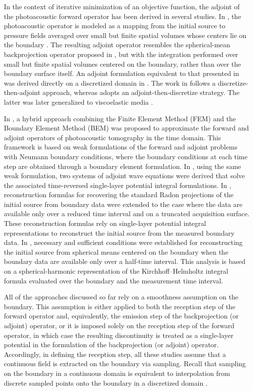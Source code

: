 \documentclass[11pt,reqno]{amsart}
\theoremstyle{remark}
\begin{document}
In the context of iterative minimization of an objective function, the adjoint of the photoacoustic forward operator has been derived in several studies. In \cite{Arridge2016}, the photoacoustic operator is modeled as a mapping from the initial source to pressure fields averaged over small but finite spatial volumes whose centers lie on the boundary \cite{Arridge2016}. The resulting adjoint operator resembles the spherical-mean backprojection operator proposed in \cite{Kruger1995}, but with the integration performed over small but finite spatial volumes centered on the boundary, rather than over the boundary surface itself.  An adjoint formulation equivalent to that presented in \cite{Arridge2016} was derived directly on a discretized domain in \cite{Huang2013}. The work in \cite{Huang2013} follows a discretize-then-adjoint approach, whereas \cite{Arridge2016} adopts an adjoint-then-discretize strategy. The latter was later generalized to viscoelastic media \cite{Javaherian2018}.

In \cite{Belhachmi2016}, a hybrid approach combining the Finite Element Method (FEM) and the Boundary Element Method (BEM) was proposed to approximate the forward and adjoint operators of photoacoustic tomography in the time domain. This framework is based on weak formulations of the forward and adjoint problems with Neumann boundary conditions, where the boundary conditions at each time step are obtained through a boundary element formulation. In \cite{Haltmeier2017}, using the same weak formulation, two systems of adjoint wave equations were derived that solve the associated time-reversed single-layer potential integral formulations. In \cite{Do2018}, reconstruction formulas for recovering the standard Radon projections of the initial source from boundary data were extended to the case where the data are available only over a reduced time interval and on a truncated acquisition surface. These reconstruction formulas rely on single-layer potential integral representations to reconstruct the initial source from the measured boundary data. In \cite{Kuchment2025}, necessary and sufficient conditions were established for reconstructing the initial source from spherical means centered on the boundary when the boundary data are available only over a half-time interval. This analysis is based on a spherical-harmonic representation of the Kirchhoff--Helmholtz integral formula evaluated over the boundary and the measurement time interval.

All of the approaches discussed so far rely on a smoothness assumption on the boundary. This assumption is either applied to both the reception step of the forward operator and, equivalently, the emission step of the backprojection (or adjoint) operator, or it is imposed solely on the reception step of the forward operator, in which case the resulting discontinuity is treated as a single-layer potential in the formulation of the backprojection (or adjoint) operator. Accordingly, in defining the reception step, all these studies assume that a continuous field is extracted on the boundary via sampling. Recall that sampling on the boundary in a continuous domain is equivalent to interpolation from discrete sampled points onto the boundary in a discretized domain \cite{Huang2013}.
\end{document}
